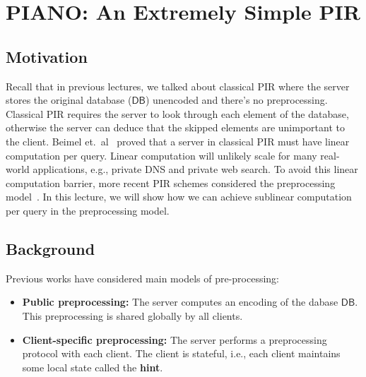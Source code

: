 \newcommand{\PRF}{\ensuremath{{\sf PRF}}}



\section{PIANO: An Extremely Simple PIR}

\subsection{Motivation}
Recall that in previous lectures, we talked about classical PIR where the server stores the original database ($\mathsf{DB}$) unencoded and there's no preprocessing. Classical PIR requires the server to look through each element of the database, otherwise the server can deduce that the skipped elements are unimportant to the client. Beimel et.~al~\cite{beimel2000reducing} proved that a server in classical PIR must have linear computation per query.
Linear computation will unlikely 
scale for many real-world applications, e.g., private DNS and private 
web search. 
To avoid this linear computation barrier,  
more recent PIR schemes 
considered 
the preprocessing model~\cite{beimel2000reducing,sublinearpir}. 
In this lecture, we will show how we can achieve sublinear computation
per query in the preprocessing model. 

\subsection{Background}
Previous works have considered 
main models of pre-processing: 

    \begin{itemize}
        \item \textbf{Public preprocessing:} The server computes an encoding of the dabase 
$\mathsf{DB}$. This preprocessing is shared
globally by all clients. %
        \item \textbf{Client-specific preprocessing:} 
The server performs a preprocessing protocol with each client. The client is stateful, i.e., each client maintains some local state called the \textbf{hint}.
    \end{itemize}

